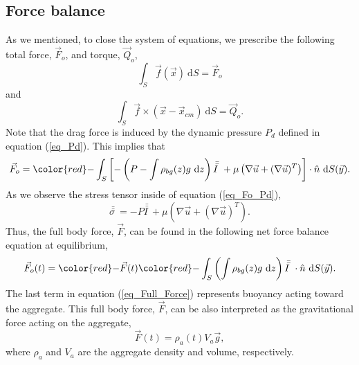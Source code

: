 \subsection{Force balance}
As we mentioned, to close the system of equations, we prescribe the following total force, $\vec{F}_o$, and torque, $\vec{Q}_o $,
\begin{equation}
	\int_S \vec{f} (\vec{x}) \ \textrm{d}S = \vec{F}_o
\label{eq_Fo}
\end{equation}
and
\begin{equation}
	\int_S \vec{f}\times (\vec{x} - \vec{x}_{cm}) \ \textrm{d}S = \vec{Q}_o.
\label{eq_Qo}
\end{equation}
 Note that the drag force is induced by the dynamic pressure $P_d$ defined in equation (\ref{eq_Pd}). This implies that 
\begin{equation}
	\vec{F}_o 
	 = {\color{red} - } \int_S \left[ 
	 - \left( P -  \int \rho_{bg}(z) g \ \textrm{d}z \right) \bar{\bar{I \ }} 
	 + \mu \left( \nabla \vec{u} + (\nabla \vec{u})^{T} \right)
	 \right] \cdot \hat{n} \ \textrm{d}S (\vec{y}).
\label{eq_Fo_Pd}
\end{equation}
As we observe the stress tensor inside of equation (\ref{eq_Fo_Pd}), 
\begin{equation}
	\bar{\bar{\sigma \ }} = 
 -  P  \bar{\bar{I \ }} 
 + \mu \left( \nabla \vec{u} + (\nabla \vec{u})^{T} \right).
\end{equation}
Thus, the full body force, $\vec{F}$, can be found in the following net force balance equation at equilibrium,
\begin{equation}
	\vec{F}_o (t)
	  = {\color{red} - } \vec{F}(t)
	  {\color{red} - }  \int_S \left( 
	   \int \rho_{bg}(z) g \ \textrm{d}z 
	 \right) \bar{\bar{I \ }}  \cdot
	\hat{n} \ \textrm{d}S (\vec{y}).
\label{eq_Full_Force}
\end{equation}
The last term in equation (\ref{eq_Full_Force}) represents buoyancy acting toward the aggregate. 
This full body force, $\vec{F}$, can be also interpreted as the gravitational force acting on the aggregate,
\begin{equation}
	\vec{F}(t) = \rho_a(t) V_a \vec{g}, 
\end{equation}
where $\rho_a$  and $V_a$ are the aggregate density and volume, respectively. 
